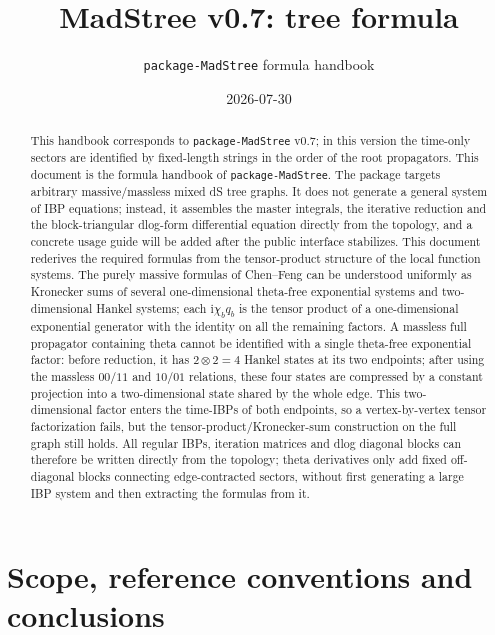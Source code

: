 \documentclass[11pt,a4paper]{article}
\title{MadStree v0.7: tree formula}
\author{\texttt{package-MadStree} formula handbook}
\date{2026-07-30}
\newcommand{\ii}{\mathrm i}
\begin{document}
\maketitle

\begin{abstract}
This handbook corresponds to \texttt{package-MadStree} v0.7; in this version the time-only sectors are identified by fixed-length strings in the order of the root propagators.
This document is the formula handbook of \texttt{package-MadStree}. The package targets arbitrary massive/massless mixed dS tree graphs. It does not generate a general system of IBP equations; instead, it assembles the master integrals, the iterative reduction and the block-triangular dlog-form differential equation directly from the topology, and a concrete usage guide will be added after the public interface stabilizes. This document rederives the required formulas from the tensor-product structure of the local function systems. The purely massive formulas of Chen--Feng can be understood uniformly as Kronecker sums of several one-dimensional theta-free exponential systems and two-dimensional Hankel systems; each $\ii\chi_bq_b$ is the tensor product of a one-dimensional exponential generator with the identity on all the remaining factors. A massless full propagator containing theta cannot be identified with a single theta-free exponential factor: before reduction, it has $2\otimes2=4$ Hankel states at its two endpoints; after using the massless $00/11$ and $10/01$ relations, these four states are compressed by a constant projection into a two-dimensional state shared by the whole edge. This two-dimensional factor enters the time-IBPs of both endpoints, so a vertex-by-vertex tensor factorization fails, but the tensor-product/Kronecker-sum construction on the full graph still holds. All regular IBPs, iteration matrices and dlog diagonal blocks can therefore be written directly from the topology; theta derivatives only add fixed off-diagonal blocks connecting edge-contracted sectors, without first generating a large IBP system and then extracting the formulas from it.
\end{abstract}

\tableofcontents

\section{Scope, reference conventions and conclusions}
\end{document}
